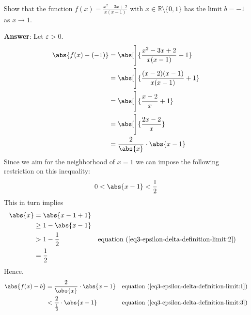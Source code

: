 \begin{exm}\label{exm-epsilon-delta-definition-limit:3}
	Show \cite[p.69]{wuest2009} that the function $f(x)=\tfrac{x^2-3x+2}{x(x-1)}$
	with $x\in\mathbb{R}\setminus\{0,1\}$ has the limit $b=-1$ as $x\to1$.
	\begin{flushleft}
		\textbf{Answer}: Let $\varepsilon>0$.
		\begin{align}
			\abs{f(x)-(-1)} & =\abs[\Bigg]{\frac{x^2-3x+2}{x(x-1)}+1}\nonumber                             \\
			                & =\abs[\Bigg]{\frac{(x-2)(x-1)}{x(x-1)}+1}\nonumber                           \\
			                & =\abs[\Bigg]{\frac{x-2}{x}+1}\nonumber                                       \\
			                & =\abs[\Bigg]{\frac{2x-2}{x}}\nonumber                                        \\
			                & =\frac{2}{\abs{x}}\cdot\abs{x-1}\label{eq3-epsilon-delta-definition-limit:1}
		\end{align}
		Since we aim for the neighborhood of $x=1$ we can impose the following
		restriction on this inequality:
		\begin{equation}\label{eq3-epsilon-delta-definition-limit:2}
			0<\abs{x-1}<\frac{1}{2}
		\end{equation}
		This in turn implies
		\begin{align}
			\abs{x} & =\abs{x-1+1}\nonumber                                                                                                               \\
			        & \geq1-\abs{x-1}\nonumber                                                                                                            \\
			        & >1-\frac{1}{2}                                           &  & \text{\pref{equation}{eq3-epsilon-delta-definition-limit:2}}\nonumber \\
			        & =\frac{1}{2}\label{eq3-epsilon-delta-definition-limit:3}
		\end{align}
		Hence,
		\begin{align}
			\abs{f(x)-b} & =\frac{2}{\abs{x}}\cdot\abs{x-1}                             &  & \text{\pref{equation}{eq3-epsilon-delta-definition-limit:1}}\nonumber \\
			             & <\frac{2}{\tfrac{1}{2}}\cdot\abs{x-1}                        &  & \text{\pref{equation}{eq3-epsilon-delta-definition-limit:3}}\nonumber \\

\end{align}
\end{flushleft}
\end{exm}

